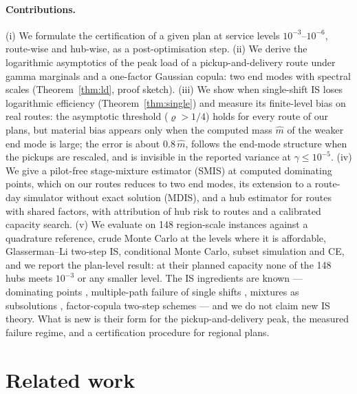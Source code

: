 \documentclass[ijoc,sglanonrev]{informs4}
\begin{document}
\paragraph{Contributions.}
(i) We formulate the certification of a given plan at service levels
$10^{-3}$--$10^{-6}$, route-wise and hub-wise, as a post-optimisation step.
(ii) We derive the logarithmic asymptotics of the peak load of a
pickup-and-delivery route under gamma marginals and a one-factor Gaussian
copula: two end modes with spectral scales (Theorem~\ref{thm:ld}, proof
sketch).
(iii) We show when single-shift IS loses logarithmic efficiency
(Theorem~\ref{thm:single}) and measure its finite-level bias on real routes:
the asymptotic threshold ($\varrho>1/4$) holds for every route of our plans,
but material bias appears only when the computed mass $\hat m$ of the weaker
end mode is large; the error is about $0.8\,\hat m$, follows the end-mode
structure when the pickups are rescaled, and is invisible in the reported
variance at $\gamma\le10^{-5}$.
(iv) We give a pilot-free stage-mixture estimator (SMIS) at computed
dominating points, which on our routes reduces to two end modes, its extension
to a route-day simulator without exact solution (MDIS), and a hub estimator for
routes with shared factors, with attribution of hub risk to routes and a
calibrated capacity search.
(v) We evaluate on 148 region-scale instances against a quadrature
reference, crude Monte Carlo at the levels where it is affordable,
Glasserman--Li two-step IS, conditional Monte Carlo, subset simulation and CE,
and we report the plan-level result: at their planned capacity none of the 148
hubs meets $10^{-3}$ or any smaller level.
The IS ingredients are known --- dominating points
\citep{SadowskyBucklew1990}, multiple-path failure of single shifts
\citep{GlassermanWang1997}, mixtures as subsolutions \citep{DupuisWang2007},
factor-copula two-step schemes \citep{GlassermanLi2005,BassambooJunejaZeevi2008}
--- and we do not claim new IS theory. What is new is their form for the
pickup-and-delivery peak, the measured failure regime, and a certification
procedure for regional plans.

\section{Related work}
\label{sec:related}
\end{document}
